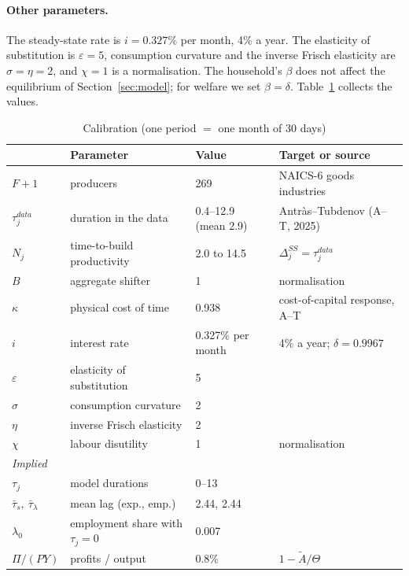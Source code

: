 \documentclass[11pt]{article}
\theoremstyle{definition}
\begin{document}
\paragraph{Other parameters.}
The steady-state rate is $i=0.327\%$ per month, 4\% a year. The elasticity of substitution is $\varepsilon=5$,
consumption curvature and the inverse Frisch elasticity are $\sigma=\eta=2$, and $\chi=1$ is a
normalisation. The household's $\beta$ does not affect the equilibrium of Section~\ref{sec:model};
for welfare we set $\beta=\delta$. Table~\ref{tab:calib} collects the values.

\begin{table}[h]
  \centering
  \caption{Calibration (one period $=$ one month of 30 days)}\label{tab:calib}
  \small
  \begin{tabular}{llll}
    \toprule
    & Parameter & Value & Target or source \\
    \midrule
    $F+1$ & producers & 269 & NAICS-6 goods industries \\
    $\tau_j^{data}$ & duration in the data & 0.4--12.9 (mean 2.9) & Antr\`as--Tubdenov (A--T, 2025) \\
    $N_j$ & time-to-build productivity & 2.0 to 14.5 & $\Delta_j^{SS}=\tau_j^{data}$ \\
    $B$ & aggregate shifter & 1 & normalisation \\
    $\kappa$ & physical cost of time & 0.938 & cost-of-capital response, A--T \\
    $i$ & interest rate & 0.327\% per month & 4\% a year; $\delta=0.9967$ \\
    $\varepsilon$ & elasticity of substitution & 5 & \\
    $\sigma$ & consumption curvature & 2 & \\
    $\eta$ & inverse Frisch elasticity & 2 & \\
    $\chi$ & labour disutility & 1 & normalisation \\
    \midrule
    \multicolumn{4}{l}{\emph{Implied}}\\
    $\tau_j$ & model durations & 0--13 & \\
    $\bar\tau_s,\ \bar\tau_\lambda$ & mean lag (exp., emp.) & 2.44, 2.44 & \\
    $\lambda_0$ & employment share with $\tau_j=0$ & 0.007 & \\
    $\Pi/(PY)$ & profits / output & 0.8\% & $1-\tilde A/\Theta$ \\
    \bottomrule
  \end{tabular}
\end{table}
\end{document}
